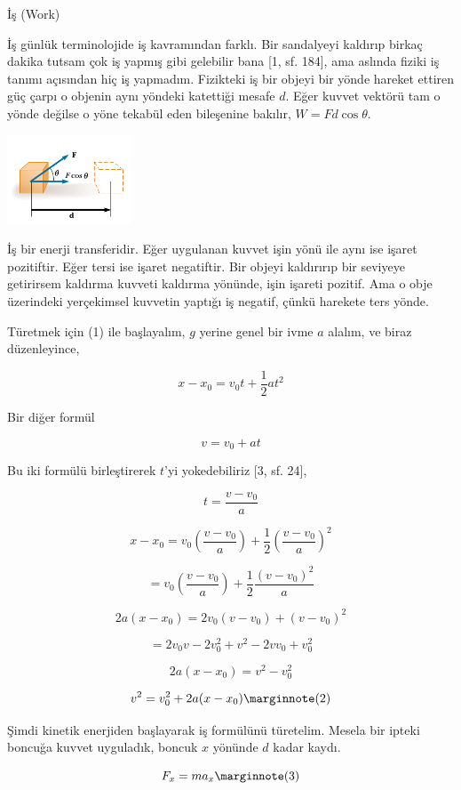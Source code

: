 \documentclass[12pt,fleqn]{article}\usepackage{../../common}
\begin{document}
İş (Work)

İş günlük terminolojide iş kavramından farklı. Bir sandalyeyi kaldırıp
birkaç dakika tutsam çok iş yapmış gibi gelebilir bana [1, sf. 184],
ama aslında fiziki iş tanımı açısından hiç iş yapmadım. Fizikteki iş
bir objeyi bir yönde hareket ettiren güç çarpı o objenin aynı yöndeki
katettiği mesafe $d$. Eğer kuvvet vektörü tam o yönde değilse o yöne
tekabül eden bileşenine bakılır, $W = F d \cos\theta$.

\includegraphics[width=10em]{phy_005_basics_06.png}

İş bir enerji transferidir. Eğer uygulanan kuvvet işin yönü ile aynı
ise işaret pozitiftir. Eğer tersi ise işaret negatiftir. Bir objeyi
kaldırırıp bir seviyeye getirirsem kaldırma kuvveti kaldırma yönünde,
işin işareti pozitif. Ama o obje üzerindeki yerçekimsel kuvvetin
yaptığı iş negatif, çünkü harekete ters yönde. 

Türetmek için (1) ile başlayalım, $g$ yerine genel bir ivme $a$ alalım, ve
biraz düzenleyince,

$$
x - x_0 = v_0 t + \frac{1}{2} a t^2
$$

Bir diğer formül

$$
v = v_0 + a t
$$

Bu iki formülü birleştirerek $t$'yi yokedebiliriz [3, sf. 24], 

$$
t = \frac{v-v_0}{a}
$$

$$
x - x_0 = 
v_0 \left(\frac{v-v_0}{a}\right) + 
\frac{1}{2} \left(\frac{v-v_0}{a}\right)^2
$$

$$
= v_0 \left(\frac{v-v_0}{a}\right) + \frac{1}{2} \frac{(v-v_0)^2}{a}
$$

$$
2a (x-x_0) = 2 v_0 (v-v_0) + (v-v_0)^2
$$

$$
= 2 v_0 v - 2 v_0^2 + v^2 - 2 v v_0 + v_0^2
$$

$$
2a (x-x_0) = v^2 - v_0^2 
$$

$$
v^2 = v_0^2 + 2a (x-x_0)  
\mlabel{2}
$$

Şimdi kinetik enerjiden başlayarak iş formülünü türetelim. Mesela bir
ipteki boncuğa kuvvet uyguladık, boncuk $x$ yönünde $d$ kadar kaydı. 

$$
F_x = m a_x
\mlabel{3}
$$
\end{document}
